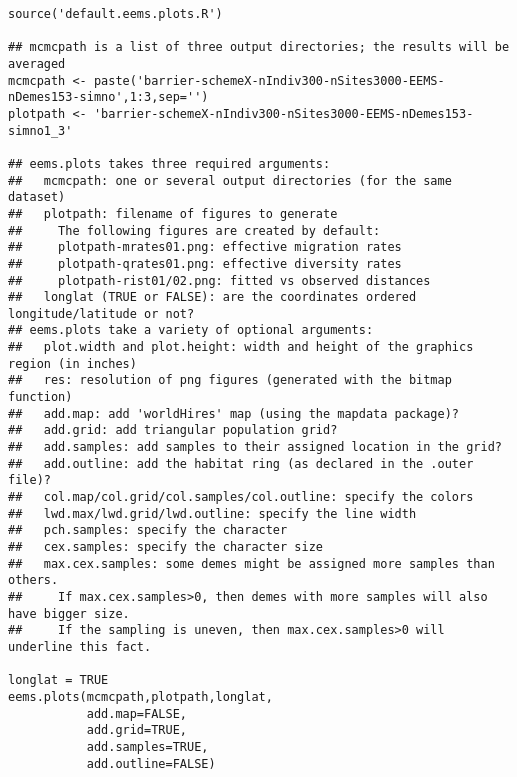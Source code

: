 \documentclass[a4paper,10pt,DIV=15,mpinclude=true]{scrartcl}
\begin{document}
\begin{verbatim}
source('default.eems.plots.R')

## mcmcpath is a list of three output directories; the results will be averaged
mcmcpath <- paste('barrier-schemeX-nIndiv300-nSites3000-EEMS-nDemes153-simno',1:3,sep='')
plotpath <- 'barrier-schemeX-nIndiv300-nSites3000-EEMS-nDemes153-simno1_3'

## eems.plots takes three required arguments:
##   mcmcpath: one or several output directories (for the same dataset)
##   plotpath: filename of figures to generate
##     The following figures are created by default:
##     plotpath-mrates01.png: effective migration rates
##     plotpath-qrates01.png: effective diversity rates
##     plotpath-rist01/02.png: fitted vs observed distances
##   longlat (TRUE or FALSE): are the coordinates ordered longitude/latitude or not?
## eems.plots take a variety of optional arguments:
##   plot.width and plot.height: width and height of the graphics region (in inches)                                      
##   res: resolution of png figures (generated with the bitmap function)                        
##   add.map: add 'worldHires' map (using the mapdata package)?                                 
##   add.grid: add triangular population grid?                                                  
##   add.samples: add samples to their assigned location in the grid?                           
##   add.outline: add the habitat ring (as declared in the .outer file)?                        
##   col.map/col.grid/col.samples/col.outline: specify the colors                               
##   lwd.max/lwd.grid/lwd.outline: specify the line width                                       
##   pch.samples: specify the character                                                         
##   cex.samples: specify the character size                                                    
##   max.cex.samples: some demes might be assigned more samples than others.                    
##     If max.cex.samples>0, then demes with more samples will also have bigger size.           
##     If the sampling is uneven, then max.cex.samples>0 will underline this fact.

longlat = TRUE                                              
eems.plots(mcmcpath,plotpath,longlat,
           add.map=FALSE,
           add.grid=TRUE,
           add.samples=TRUE,
           add.outline=FALSE)
\end{verbatim}
\end{document}
